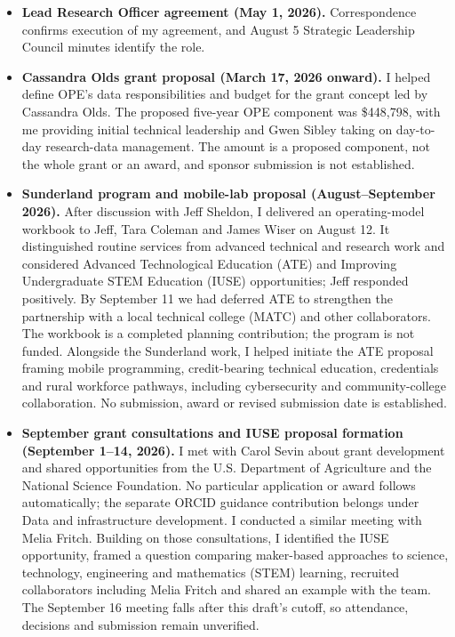 \begin{itemize}
\item \textbf{Lead Research Officer agreement (May 1, 2026).} Correspondence confirms execution of my agreement, and August 5 Strategic Leadership Council minutes identify the role. 
\item \textbf{Cassandra Olds grant proposal (March 17, 2026 onward).} I helped define OPE's data responsibilities and budget for the grant concept led by Cassandra Olds. The proposed five-year OPE component was \$448,798, with me providing initial technical leadership and Gwen Sibley taking on day-to-day research-data management. The amount is a proposed component, not the whole grant or an award, and sponsor submission is not established.
\item \textbf{Sunderland program and mobile-lab proposal (August--September 2026).} After discussion with Jeff Sheldon, I delivered an operating-model workbook to Jeff, Tara Coleman and James Wiser on August 12. It distinguished routine services from advanced technical and research work and considered Advanced Technological Education (ATE) and Improving Undergraduate STEM Education (IUSE) opportunities; Jeff responded positively. By September 11 we had deferred ATE to strengthen the partnership with a local technical college (MATC) and other collaborators. The workbook is a completed planning contribution; the program is not funded. Alongside the Sunderland work, I helped initiate the ATE proposal framing mobile programming, credit-bearing technical education, credentials and rural workforce pathways, including cybersecurity and community-college collaboration. No submission, award or revised submission date is established.
\item \textbf{September grant consultations and IUSE proposal formation (September 1--14, 2026).} I met with Carol Sevin about grant development and shared opportunities from the U.S. Department of Agriculture and the National Science Foundation. No particular application or award follows automatically; the separate ORCID guidance contribution belongs under Data and infrastructure development. I conducted a similar meeting with Melia Fritch. Building on those consultations, I identified the IUSE opportunity, framed a question comparing maker-based approaches to science, technology, engineering and mathematics (STEM) learning, recruited collaborators including Melia Fritch and shared an example with the team. The September 16 meeting falls after this draft's cutoff, so attendance, decisions and submission remain unverified.

\end{itemize}
